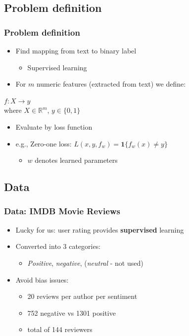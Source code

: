 \documentclass{beamer}
\begin{document}
\subsection{Problem definition}
\begin{frame}
	\frametitle{Problem definition}
	\begin{itemize}
		\item Find mapping from text to binary label
		\begin{itemize}
			\item Supervised learning
		\end{itemize} \pause
		\item For $m$ numeric features (extracted from text) we define:
	\end{itemize}
	\begin{definition}
		\center
		$f: X \to y$ \\
		where $X \in \mathbb{R}^{m}$, $y \in \{0,1\}$
	\end{definition}
	\pause
	\begin{itemize}
		\item Evaluate by loss function
		\item e.g., Zero-one loss: $L(x,y,f_w)=\textbf{1}\{ f_w(x) \neq y \}$
		\begin{itemize}
			\item $w$ denotes learned parameters
		\end{itemize}
	\end{itemize}
\end{frame}

\subsection{Data}

\begin{frame}
	\frametitle{Data: IMDB Movie Reviews}
	\begin{itemize}
		\item Lucky for us: user rating provides \textbf{supervised} learning
		\item Converted into 3 categories:
		\begin{itemize}
			\item \emph{Positive}, \emph{negative}, (\emph{neutral} - not used)
		\end{itemize}
		\item Avoid bias issues:
		\begin{itemize}
			\item 20 reviews per author per sentiment
			\item 752 negative vs 1301 positive
			\item total of 144 reviewers
		\end{itemize}
	\end{itemize}
\end{frame}
\end{document}
